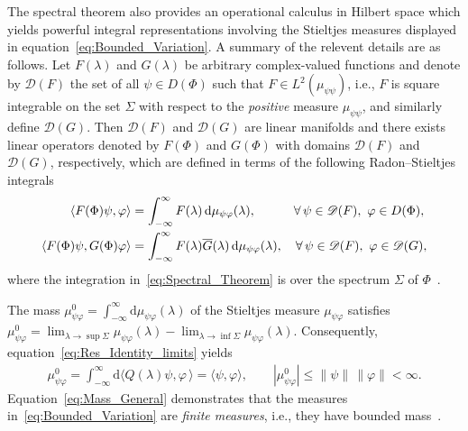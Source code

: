 \documentclass[leqno,onefignum,onetabnum]{siamltex1213}
\renewcommand{\d}{\mathrm{d}}
\newcommand{\Ds}{\mathscr{D}}
\begin{document}
The spectral theorem also provides an operational calculus in Hilbert
space which yields powerful integral representations involving the
Stieltjes measures displayed in
equation~\eqref{eq:Bounded_Variation}. A summary of the relevent
details are as   
follows. Let $F(\lambda)$ and $G(\lambda)$ be arbitrary complex-valued functions
and denote by $\Ds(F)$ the set of all $\psi\in D(\Phi)$ such that
$F\in L^2(\mu_{\psi\psi})$, i.e., $F$ is square integrable on the set
$\Sigma$ with respect to the \emph{positive} measure $\mu_{\psi\psi}$, and similarly define
$\Ds(G)$. Then $\Ds(F)$ and $\Ds(G)$ are linear manifolds and there
exists linear operators denoted by $F(\Phi)$ and $G(\Phi)$ with domains
$\Ds(F)$ and $\Ds(G)$, respectively, which are defined in terms of the
following Radon--Stieltjes integrals~\cite{Stone:64}  
%
\begin{align}\label{eq:Spectral_Theorem}
  \langle F(\Phi)\psi,\varphi\rangle&=\int_{-\infty}^\infty F(\lambda)\,\d\mu_{\psi\varphi}(\lambda), \qquad
  \hspace{1em}
  \forall \, \psi\in\mathscr{D}(F), \ \varphi\in D(\Phi),  
  \\
  \langle F(\Phi)\psi,G(\Phi)\varphi\rangle&=\int_{-\infty}^\infty F(\lambda)\overline{G}(\lambda)\,\d\mu_{\psi\varphi}(\lambda),
  \quad
  \forall \, \psi\in\mathscr{D}(F), \ \varphi\in\mathscr{D}(G),
  \notag
\end{align}
%
where the integration in~\eqref{eq:Spectral_Theorem} is over the
spectrum $\Sigma$ of $\Phi$~\cite{Reed-1980,Stone:64}.



The mass $\mu^0_{\psi\varphi}=\int_{-\infty}^\infty\d\mu_{\psi\varphi}(\lambda)$ of the
Stieltjes measure $\mu_{\psi\varphi}$ satisfies~\cite{Stone:64}
$\mu^0_{\psi\varphi}=\lim_{\lambda\to\sup\Sigma}\mu_{\psi\varphi}(\lambda)-\lim_{\lambda\to\inf\Sigma}\mu_{\psi\varphi}(\lambda)$. Consequently,
equation~\eqref{eq:Res_Identity_limits} yields
% 
\begin{align}\label{eq:Mass_General}
  \mu^0_{\psi\varphi}=\int_{-\infty}^\infty\d\langle Q(\lambda)\psi,\varphi\,\rangle=\langle\psi,\varphi\rangle,
  \qquad
  |\mu^0_{\psi\varphi}|\leq\|\psi\|\,\|\varphi\|<\infty.
\end{align}
%
Equation~\eqref{eq:Mass_General} demonstrates that the measures
in~\eqref{eq:Bounded_Variation} are \emph{finite measures}, i.e., they
have bounded mass~\cite{Stone:64}.
\end{document}

